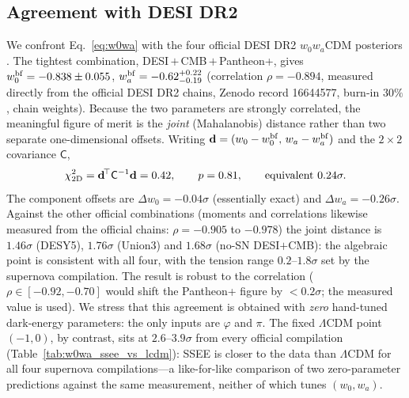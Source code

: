 \documentclass[a4paper,11pt]{article}
\begin{document}
\subsection{Agreement with DESI DR2}
\label{sec:desi-agreement}
We confront Eq.~\eqref{eq:w0wa} with the four official DESI DR2 $w_0w_a$CDM
posteriors \citep[eqs.~25--28]{AbdulKarim2025}. The tightest combination,
DESI\,$+$\,CMB\,$+$\,Pantheon+, gives
$w_0^{\rm bf}=-0.838\pm0.055$, $w_a^{\rm bf}=-0.62^{+0.22}_{-0.19}$
(correlation $\rho=-0.894$, measured directly from the official DESI DR2
chains, Zenodo record 16644577, burn-in $30\%$, chain weights). Because the two parameters are strongly
correlated, the meaningful figure of merit is the \emph{joint} (Mahalanobis)
distance rather than two separate one-dimensional offsets. Writing
$\mathbf{d}=(w_0-w_0^{\rm bf},\,w_a-w_a^{\rm bf})$ and the $2\times2$
covariance $\mathsf{C}$,
\begin{equation}
  \chi^2_{\rm 2D}=\mathbf{d}^{\!\top}\mathsf{C}^{-1}\mathbf{d}=0.42,
  \qquad
  p=0.81,
  \qquad
  \text{equivalent } 0.24\sigma .
  \label{eq:chi2}
\end{equation}
The component offsets are $\Delta w_0=-0.04\sigma$ (essentially exact) and
$\Delta w_a=-0.26\sigma$. Against the other official combinations (moments and
correlations likewise measured from the official chains: $\rho=-0.905$ to
$-0.978$) the joint
distance is $1.46\sigma$ (DESY5), $1.76\sigma$ (Union3) and $1.68\sigma$
(no-SN DESI$+$CMB): the algebraic point is consistent with all four, with the
tension range $0.2$--$1.8\sigma$ set by the supernova compilation. The result
is robust to the correlation ($\rho\in[-0.92,-0.70]$ would shift the
Pantheon+ figure by $<0.2\sigma$; the measured value is used). We stress that this agreement is obtained
with \emph{zero} hand-tuned dark-energy parameters: the only inputs are
$\varphi$ and $\pi$. The fixed $\Lambda$CDM point $(-1,0)$, by contrast, sits at
$2.6$--$3.9\sigma$ from every official compilation
(Table~\ref{tab:w0wa_ssee_vs_lcdm}): SSEE is closer to the data than
$\Lambda$CDM for all four supernova compilations---a like-for-like comparison of
two zero-parameter predictions against the same measurement, neither of which
tunes $(w_0,w_a)$.
\end{document}
